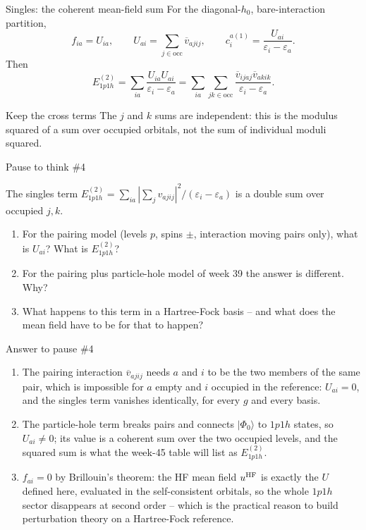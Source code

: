 \documentclass[aspectratio=169,10pt]{beamer}
\newcounter{thinkctr}
\newcommand{\thinkq}[2]{%
  \stepcounter{thinkctr}%
  \vfill
  \begin{tcolorbox}[enhanced,colback=palewarm,colframe=warm,boxrule=1.2pt,arc=4pt,
    grow to left by=6mm,grow to right by=6mm,
    left=16pt,right=16pt,top=16pt,bottom=18pt,
    fonttitle=\bfseries\Large,fontupper=\Large,
    title={Pause to think \#\thethinkctr\hfill\mdseries\normalsize(about #1 min -- discuss with your neighbour)}]
  #2
  \end{tcolorbox}
  \vfill}
\newcommand{\thinka}[1]{%
  \vfill
  \begin{tcolorbox}[enhanced,colback=paleteal,colframe=teal,boxrule=1.2pt,arc=4pt,
    grow to left by=6mm,grow to right by=6mm,
    left=16pt,right=16pt,top=16pt,bottom=18pt,
    fonttitle=\bfseries\Large,fontupper=\large,
    title={Answer to pause \#\thethinkctr}]
  #1
  \end{tcolorbox}
  \vfill}
\newcommand{\ket}[1]{\vert #1\rangle}
\newcommand{\vbar}[4]{\overline v_{#1#2#3#4}}
\newcommand{\ph}{\Phi_0}
\begin{document}
\begin{frame}{Singles: the coherent mean-field sum}
For the diagonal-\(h_0\), bare-interaction partition,
\[
f_{ia}=U_{ia},\qquad U_{ai}=\sum_{j\in\mathrm{occ}}\vbar{a}{j}{i}{j},\qquad
c_i^{a(1)}=\frac{U_{ai}}{\varepsilon_i-\varepsilon_a}.
\]
Then
\[
E^{(2)}_{1p1h}
=\sum_{ia}\frac{U_{ia}U_{ai}}{\varepsilon_i-\varepsilon_a}
=\sum_{ia}\sum_{jk\in\mathrm{occ}}
\frac{\vbar{i}{j}{a}{j}\vbar{a}{k}{i}{k}}
 {\varepsilon_i-\varepsilon_a}.
\]
\begin{exampleblock}{Keep the cross terms}
The \(j\) and \(k\) sums are independent: this is the modulus squared of a sum over occupied orbitals, not the sum of individual moduli squared.
\end{exampleblock}
\end{frame}

\begin{frame}{Pause to think \#4}
\thinkq{3}{The singles term \(E^{(2)}_{1p1h}=\sum_{ia}|\sum_jv_{ajij}|^2/(\varepsilon_i-\varepsilon_a)\) is a double sum over occupied \(j,k\).
\begin{enumerate}
\item For the pairing model (levels \(p\), spins \(\pm\), interaction moving pairs only), what is \(U_{ai}\)? What is \(E^{(2)}_{1p1h}\)?
\item For the pairing plus particle-hole model of week 39 the answer is different. Why?
\item What happens to this term in a Hartree-Fock basis -- and what does the mean field have to be for that to happen?
\end{enumerate}}
\end{frame}

\begin{frame}{Answer to pause \#4}
\thinka{%
\begin{enumerate}
\item The pairing interaction \(\vbar{a}{j}{i}{j}\) needs \(a\) and \(i\) to be the two members of the same pair, which is impossible for \(a\) empty and \(i\) occupied in the reference: \(U_{ai}=0\), and the singles term vanishes identically, for every \(g\) and every basis.
\item The particle-hole term breaks pairs and connects \(\ket{\ph}\) to \(1p1h\) states, so \(U_{ai}\ne0\); its value is a coherent sum over the two occupied levels, and the squared sum is what the week-45 table will list as \(E^{(2)}_{1p1h}\).
\item \(f_{ai}=0\) by Brillouin's theorem: the HF mean field \(u^{\rm HF}\) is exactly the \(U\) defined here, evaluated in the self-consistent orbitals, so the whole \(1p1h\) sector disappears at second order -- which is the practical reason to build perturbation theory on a Hartree-Fock reference.
\end{enumerate}}
\end{frame}
\end{document}
